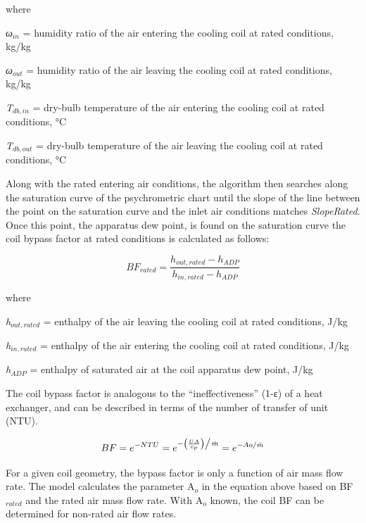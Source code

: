 where

\emph{ω\(_{in}\)} = humidity ratio of the air entering the cooling coil at rated conditions, kg/kg

\emph{ω\(_{out}\)} = humidity ratio of the air leaving the cooling coil at rated conditions, kg/kg

\emph{T\(_{db,in}\)} = dry-bulb temperature of the air entering the cooling coil at rated conditions, °C

\emph{T\(_{db,out}\)} = dry-bulb temperature of the air leaving the cooling coil at rated conditions, °C

Along with the rated entering air conditions, the algorithm then searches along the saturation curve of the psychrometric chart until the slope of the line between the point on the saturation curve and the inlet air conditions matches \emph{SlopeRated}. Once this point, the apparatus dew point, is found on the saturation curve the coil bypass factor at rated conditions is calculated as follows:

\begin{equation}
B{F_{rated}} = \frac{{{h_{out,rated}} - {h_{ADP}}}}{{{h_{in,rated}} - {h_{ADP}}}}
\end{equation}

where

\emph{h\(_{out,rated}\)} = enthalpy of the air leaving the cooling coil at rated conditions, J/kg

\emph{h\(_{in,rated}\)} = enthalpy of the air entering the cooling coil at rated conditions, J/kg

\emph{h\(_{ADP}\)} = enthalpy of saturated air at the coil apparatus dew point, J/kg

The coil bypass factor is analogous to the ``ineffectiveness'' (1-ε) of a heat exchanger, and can be described in terms of the number of transfer of unit (NTU).

\begin{equation}
BF = {e^{ - NTU}} = {e^{{{ - \left( {\frac{{UA}}{{{c_p}}}} \right)} \mathord{\left/ {\vphantom {{ - \left( {\frac{{UA}}{{{c_p}}}} \right)} {\dot m}}} \right. } {\dot m}}}} = {e^{ - Ao/\dot m}}
\end{equation}

For a given coil geometry, the bypass factor is only a function of air mass flow rate. The model calculates the parameter A\(_{o}\) in the equation above based on BF\(_{rated}\) and the rated air mass flow rate. With A\(_{o}\) known, the coil BF can be determined for non-rated air flow rates.

